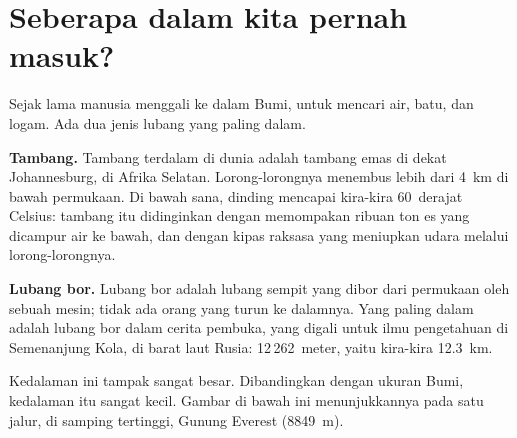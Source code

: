 \section{Seberapa dalam kita pernah masuk?}

Sejak lama manusia menggali ke dalam Bumi, untuk mencari air, batu, dan
logam. Ada dua jenis lubang yang paling dalam.

\textbf{Tambang.} Tambang terdalam di dunia adalah tambang emas di dekat
Johannesburg, di Afrika Selatan. Lorong-lorongnya menembus lebih dari 4~km
di bawah permukaan. Di bawah sana, dinding  mencapai kira-kira
60~derajat Celsius: tambang itu didinginkan dengan memompakan ribuan ton es
yang dicampur air ke bawah, dan dengan kipas raksasa yang meniupkan udara
melalui lorong-lorongnya.

\textbf{Lubang bor.} Lubang bor adalah lubang sempit yang dibor dari
permukaan oleh sebuah mesin; tidak ada orang yang turun ke dalamnya. Yang
paling dalam adalah lubang bor dalam cerita pembuka, yang digali untuk
ilmu pengetahuan di Semenanjung Kola, di barat laut Rusia: 12\,262~meter,
yaitu kira-kira 12.3~km.

Kedalaman ini tampak sangat besar. Dibandingkan dengan ukuran Bumi,
kedalaman itu sangat kecil. Gambar di bawah ini menunjukkannya pada satu
jalur, di samping  tertinggi, Gunung Everest (8849~m).

